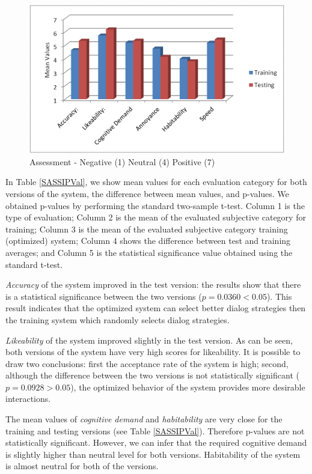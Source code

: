 \begin{sloppy}
\begin{figure}
\centering
\includegraphics[width=\columnwidth]{img/SASSI.png}
\caption{Assessment - Negative (1) Neutral (4) Positive (7)}
\label{SASSI}
\end{figure}


In Table \ref{SASSIPVal}, we show mean values for each evaluation category for both versions of the system, the difference between mean values, and p-values. We obtained p-values by performing the standard two-sample t-test. Column 1 is the type of evaluation; Column 2 is the mean of the evaluated subjective category for training; Column 3 is the mean of the evaluated subjective category training (optimized) system; Column 4 shows the difference between test and training averages; and Column 5 is the statistical significance value obtained using the standard t-test.

{\em Accuracy} of the system improved in the test version: the results show that there is a statistical significance between the two versions ($p=0.0360 < 0.05$). This result indicates that the optimized system can select better dialog strategies then the training system which randomly selects dialog strategies.

\textit{Likeability} of the system improved slightly in the test version. As can be seen, both versions of the system have very high scores for likeability. It is possible to draw two conclusions: first the acceptance rate of the system is high; second, although the difference between the two versions is not statistically significant ($p=0.0928>0.05$), the optimized behavior of the system provides more desirable interactions.
 
The mean values of \textit{cognitive demand} and \textit{habitability} are very close for the training and testing versions (see Table \ref{SASSIPVal}). Therefore p-values are not statistically significant. However, we can infer that the required cognitive demand is slightly higher than neutral level for both versions. 
Habitability of the system is almost neutral for both of the versions.


\end{sloppy}
